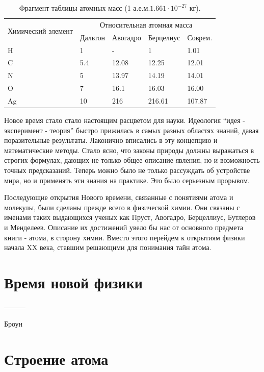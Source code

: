 \begin{table}
\label{tab:atom_mass}
    \begin{center}
        \begin{tabular}{|p{3cm}|p{2cm}|p{2cm}|p{2.2cm}|p{2cm}|}
            \hline
            \multirow{2}{}{Химический элемент} & \multicolumn{4}{|c|}{Относительная атомная масса} \\
            & Дальтон & Авогадро & Берцелиус & Соврем. \\
            \hline
            H & 1 & - & 1 & 1.01 \\
            C & 5.4 & 12.08 & 12.25 & 12.01 \\
            N & 5 & 13.97 & 14.19 & 14.01 \\
            O & 7 & 16.1 & 16.03 & 16.00 \\
            Ag & 10 & 216 & 216.61 & 107.87 \\
            \hline
        \end{tabular}
    \end{center}
\caption{Фрагмент таблицы атомных масс (1 а.е.м.\approx $1.661\cdot 10^{-27}$ кг).}
\end{table}

Новое время стало стало настоящим расцветом для науки.
Идеология ``идея - эксперимент - теория'' быстро прижилась в самых разных областях знаний, давая поразительные результаты.
Лаконично вписались в эту концепцию и математические методы.
Стало ясно, что законы природы должны выражаться в строгих формулах, дающих не только общее описание явления, но и возможность точных предсказаний.
Теперь можно было не только рассуждать об устройстве мира, но и применять эти знания на практике.
Это было серьезным прорывом.

Последующие открытия Нового времени, связанные с понятиями атома и молекулы, были сделаны прежде всего в физической химии. 
Они связаны с именами таких выдающихся ученых как Пруст, Авогадро, Берцеллиус, Бутлеров и Менделеев.
Описание их достижений увело бы нас от основного предмета книги - атома, в сторону химии.
Вместо этого перейдем к открытиям физики начала XX века, ставшим решающими для понимания тайн атома.


\section*{Время новой физики}

---------

Броун


\section*{Строение атома}

